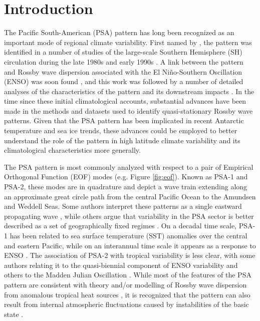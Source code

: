 \section{Introduction}

The Pacific South-American (PSA) pattern has long been recognized as an important mode of regional climate variability. First named by \citet{Mo1987}, the pattern was identified in a number of studies of the large-scale Southern Hemisphere (SH) circulation during the late 1980s and early 1990s \citep[e.g.][]{Kidson1988,Ghil1991,Lau1994}. A link between the pattern and Rossby wave dispersion associated with the El Ni\~{n}o-Southern Oscillation (ENSO) was soon found \citep[e.g.][]{Karoly1989}, and this work was followed by a number of detailed analyses of the characteristics of the pattern and its downstream impacts \citep[e.g.][]{Mo1998,Mo2000,Mo2001}. In the time since these initial climatological accounts, substantial advances have been made in the methods and datasets used to identify quasi-stationary Rossby wave patterns. Given that the PSA pattern has been implicated in recent Antarctic temperature and sea ice trends, these advances could be employed to better understand the role of the pattern in high latitude climate variability and its climatological characteristics more generally.

The PSA pattern is most commonly analyzed with respect to a pair of Empirical Orthogonal Function (EOF) modes (e.g. Figure \ref{fig:eof}). Known as PSA-1 and PSA-2, these modes are in quadrature and depict a wave train extending along an approximate great circle path from the central Pacific Ocean to the Amundsen and Weddell Seas. Some authors interpret these patterns as a single eastward propagating wave \citep{Mo1998}, while others argue that variability in the PSA sector is better described as a set of geographically fixed regimes \citep{Robertson2003}. On a decadal time scale, PSA-1 has been related to sea surface temperature (SST) anomalies over the central and eastern Pacific, while on an interannual time scale it appears as a response to ENSO \citep{Mo2001}. The association of PSA-2 with tropical variability is less clear, with some authors relating it to the quasi-biennial component of ENSO variability \citep{Mo2000} and others to the Madden Julian Oscillation \citep{Renwick1999}. While most of the features of the PSA pattern are consistent with theory and/or modelling of Rossby wave dispersion from anomalous tropical heat sources \citep[e.g.][]{Liu2007,Li2015}, it is recognized that the pattern can also result from internal atmospheric fluctuations caused by instabilities of the basic state \citep[and that both mechanisms likely act in concert; e.g.][]{Grimm2009}.

